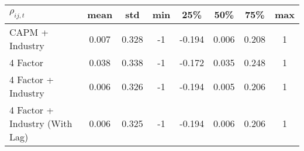             \begin{tabular}{lccccccc}
            \hline\hline
$ \rho_{ij,t} $  & {mean} &{std} &{min} & 25\%  & 50\%  & 75\%  & {max} \\
 \hline

    CAPM + Industry & 0.007 & 0.328 & -1    & -0.194 & 0.006 & 0.208 & 1 \\
    4 Factor & 0.038 & 0.338 & -1    & -0.172 & 0.035 & 0.248 & 1 \\
   4 Factor + Industry & 0.006 & 0.326 & -1    & -0.194 & 0.005 & 0.206 & 1 \\
    4 Factor + Industry (With Lag) & 0.006 & 0.325 & -1    & -0.194 & 0.006 & 0.206 & 1 \\
    
    \hline\hline
                                \end{tabular}